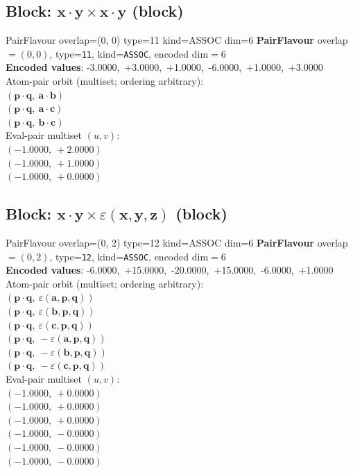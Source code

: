 \documentclass[a4paper,11pt]{article}
\newcommand{\pdcegfomjfhook}[2]{\mathbf{#1} \cdot \mathbf{#2}}
\newcommand{\kblbmcpggoncpf}[3]{\varepsilon(\mathbf{#1},\mathbf{#2},\mathbf{#3})}
\begin{document}
\subsection{Block: $\pdcegfomjfhook{x}{y} \times \pdcegfomjfhook{x}{y}$  (block)}
    PairFlavour  overlap=(0, 0)  type=11  kind=ASSOC  dim=6
\textbf{PairFlavour} overlap$=(0, 0)$, type=\texttt{11}, kind=\texttt{ASSOC}, encoded dim$=6$\\
\textbf{      Encoded values}: -3.0000,\ +3.0000,\ +1.0000,\ -6.0000,\ +1.0000,\ +3.0000\\
\quad Atom-pair orbit (multiset; ordering arbitrary):\\
$(\pdcegfomjfhook{p}{q},\ \pdcegfomjfhook{a}{b})$\\
$(\pdcegfomjfhook{p}{q},\ \pdcegfomjfhook{a}{c})$\\
$(\pdcegfomjfhook{p}{q},\ \pdcegfomjfhook{b}{c})$\\
\quad Eval-pair multiset $(u, v)$:\\
$(-1.0000,\ +2.0000)$\\
$(-1.0000,\ +1.0000)$\\
$(-1.0000,\ +0.0000)$\\

\subsection{Block: $\pdcegfomjfhook{x}{y} \times \kblbmcpggoncpf{x}{y}{z}$  (block)}
    PairFlavour  overlap=(0, 2)  type=12  kind=ASSOC  dim=6
\textbf{PairFlavour} overlap$=(0, 2)$, type=\texttt{12}, kind=\texttt{ASSOC}, encoded dim$=6$\\
\textbf{      Encoded values}: -6.0000,\ +15.0000,\ -20.0000,\ +15.0000,\ -6.0000,\ +1.0000\\
\quad Atom-pair orbit (multiset; ordering arbitrary):\\
$(\pdcegfomjfhook{p}{q},\ \kblbmcpggoncpf{a}{p}{q})$\\
$(\pdcegfomjfhook{p}{q},\ \kblbmcpggoncpf{b}{p}{q})$\\
$(\pdcegfomjfhook{p}{q},\ \kblbmcpggoncpf{c}{p}{q})$\\
$(\pdcegfomjfhook{p}{q},\ -\kblbmcpggoncpf{a}{p}{q})$\\
$(\pdcegfomjfhook{p}{q},\ -\kblbmcpggoncpf{b}{p}{q})$\\
$(\pdcegfomjfhook{p}{q},\ -\kblbmcpggoncpf{c}{p}{q})$\\
\quad Eval-pair multiset $(u, v)$:\\
$(-1.0000,\ +0.0000)$\\
$(-1.0000,\ +0.0000)$\\
$(-1.0000,\ +0.0000)$\\
$(-1.0000,\ -0.0000)$\\
$(-1.0000,\ -0.0000)$\\
$(-1.0000,\ -0.0000)$\\
\end{document}
